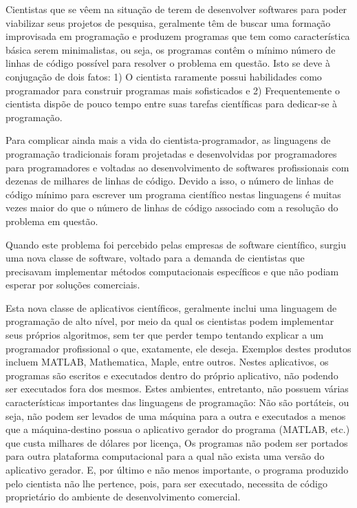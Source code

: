 \documentclass[a4paper,10pt,brazil]{sphinxmanual}
\begin{document}
Cientistas que se vêem na situação de terem de desenvolver softwares para poder viabilizar seus projetos de pesquisa, geralmente têm de buscar uma formação improvisada em programação e produzem programas que tem como característica básica serem minimalistas, ou seja, os programas contêm o mínimo número de linhas de código possível para resolver o problema em questão. Isto se deve à conjugação de dois fatos: 1) O cientista raramente possui habilidades como programador para construir programas mais sofisticados e 2) Frequentemente o cientista dispõe de pouco tempo entre suas tarefas científicas para dedicar-se à programação.

Para complicar ainda mais a vida do cientista-programador, as linguagens de programação tradicionais foram projetadas e desenvolvidas por programadores para programadores e voltadas ao desenvolvimento de softwares profissionais com dezenas de milhares de linhas de código. Devido a isso, o número de linhas de código mínimo para escrever um programa científico nestas linguagens é muitas vezes maior do que o número de linhas de código associado com a resolução do problema em questão.

Quando este problema foi percebido pelas empresas de software científico, surgiu uma nova classe de software, voltado para a demanda de cientistas que precisavam implementar métodos computacionais específicos e que não podiam esperar por soluções comerciais.

Esta nova classe de aplicativos científicos, geralmente inclui uma linguagem de programação de alto nível, por meio da qual os cientistas podem implementar seus próprios algoritmos, sem ter que perder tempo tentando explicar a um programador profissional o que, exatamente, ele deseja. Exemplos destes produtos incluem MATLAB, Mathematica, Maple, entre outros. Nestes aplicativos, os programas são escritos e executados dentro do próprio aplicativo, não podendo ser executados fora dos mesmos. Estes ambientes, entretanto, não possuem várias características importantes das linguagens de programação: Não são portáteis, ou seja, não podem ser levados de uma máquina para a outra e executados a menos que a máquina-destino possua o aplicativo gerador do programa (MATLAB, etc.) que custa milhares de dólares por licença, Os programas não podem ser portados para outra plataforma computacional para a qual não exista uma versão do aplicativo gerador. E, por último e não menos importante, o programa produzido pelo cientista
não lhe pertence, pois, para ser executado, necessita de código proprietário do ambiente de desenvolvimento comercial.
\end{document}

